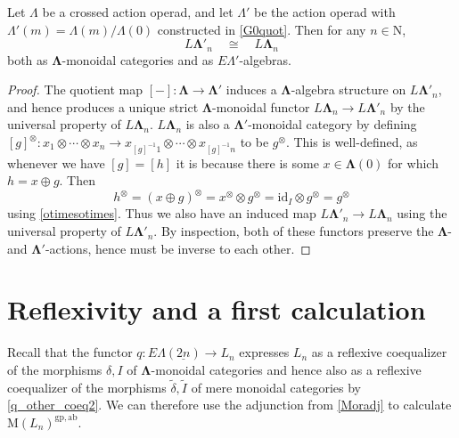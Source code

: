 \documentclass{amsbook} %
\newcommand{\id}{\textrm{id}}
\newcommand{\ML}{\mathbf{\Lambda}}
\newcommand{\ELnn}{E\Lambda(\underline{2n})}
\numberwithin{section}{chapter}
\begin{document}
\begin{thm} \label{noscalarcross} Let $\Lambda$ be a crossed action operad, and let $\Lambda'$ be the action operad with $\Lambda'(m) = \Lambda(m)/\Lambda(0)$ constructed in \cref{G0quot}. Then for any $n \in \mathrm{N}$,
  \[
    L\ML'_n \quad \cong \quad L\ML_n
  \]
both as $\ML$-monoidal categories and as $E\Lambda'$-algebras.  
\end{thm}
\begin{proof}
The quotient map $[-] \colon \ML \rightarrow \ML'$ induces a $\ML$-algebra structure on $L\ML'_n$, and hence produces a unique strict $\ML$-monoidal functor $L\ML_n \rightarrow L\ML'_n$ by the universal property of $L\ML_n$. $L\ML_n$ is also a $\ML'$-monoidal category by defining $[g]^{\otimes} \colon x_1 \otimes \cdots \otimes x_n \rightarrow x_{[g]^{-1}1} \otimes \cdots \otimes x_{[g]^{-1}n}$ to be $g^{\otimes}$. This is well-defined, as whenever we have $[g] = [h]$ it is because there is some $x \in \ML(0)$ for which $h = x \oplus g$. Then
  \[
    h^{\otimes} = (x \oplus g)^{\otimes} = x^{\otimes} \otimes g^{\otimes} = \id_I \otimes g^{\otimes} = g^{\otimes}
  \]
using \cref{otimesotimes}. Thus we also have an induced map $L\ML'_n \rightarrow L\ML_n$ using the universal property of $L\ML'_n$. By inspection, both of these functors preserve the $\ML$- and $\ML'$-actions, hence must be inverse to each other.
\end{proof}

\section{Reflexivity and a first calculation}

Recall that the functor $q \colon  \ELnn \rightarrow L_n$ expresses $L_n$ as a reflexive coequalizer of the morphisms $\delta, I$ of $\ML$-monoidal categories and hence also as a reflexive coequalizer of the morphisms $\tilde{\delta}, \tilde{I}$ of mere monoidal categories by \cref{q_other_coeq2}. We can therefore use the adjunction from \cref{Moradj} to calculate $\mathrm{M}(L_{n})^{\mathrm{gp, ab}}$. 
\end{document}
